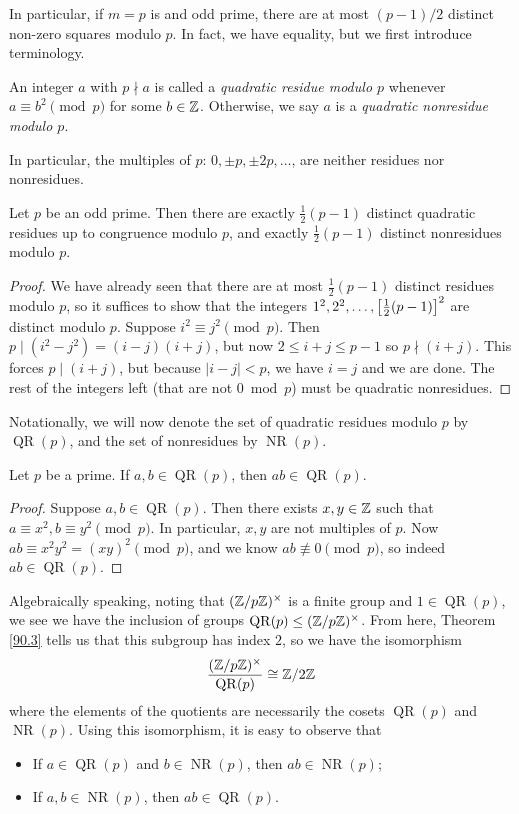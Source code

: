 \documentclass{article}
\DeclareMathOperator{\QR}{\mathrm{QR}}
\DeclareMathOperator{\NR}{\mathrm{NR}}
\begin{document}
In particular, if $m=p$ is and odd prime, there are at most $(p-1)/2$ distinct non-zero squares modulo $p$. In fact, we have equality, but we first introduce terminology.
\begin{definition}
An integer $a$ with $p\nmid a$ is called a \textit{quadratic residue modulo $p$} whenever $a \equiv b^2\pmod p$ for some $b\in \mathbb Z$. Otherwise, we say $a$ is a \textit{quadratic nonresidue modulo $p$}.
\end{definition}
In particular, the multiples of $p$: $0, \pm p, \pm 2p, \ldots$, are neither residues nor nonresidues.

\begin{theorem}\label{90.3}
Let $p$ be an odd prime. Then there are exactly $\frac 12(p-1)$ distinct quadratic residues up to congruence modulo $p$, and exactly $\frac 12(p-1)$ distinct nonresidues modulo $p$.
\end{theorem}
\begin{proof}
We have already seen that there are at most $\frac 12(p-1)$ distinct residues modulo $p$, so it suffices to show that the integers $1^2, 2^2, \ldots, \left[\frac 12(p-1)\right]^2$ are distinct modulo $p$. Suppose $i^2 \equiv j^2\pmod p$. Then $p\mid (i^2 - j^2) = (i-j)(i + j)$, but now $2 \leq i + j \leq p-1$ so $p\nmid (i+j)$. This forces $p\mid (i+j)$, but because $|i - j| < p$, we have $i=j$ and we are done. The rest of the integers left (that are not $0\bmod p$) must be quadratic nonresidues.
\end{proof}

Notationally, we will now denote the set of quadratic residues modulo $p$ by $\QR(p)$, and the set of nonresidues by $\NR(p)$.

\begin{proposition}
Let $p$ be a prime. If $a,b\in \QR(p)$, then $ab \in \QR(p)$.
\end{proposition}
\begin{proof}
Suppose $a,b\in \QR(p)$. Then there exists $x,y\in \mathbb Z$ such that $a \equiv x^2, b\equiv y^2\pmod p$. In particular, $x,y$ are not multiples of $p$. Now $ab \equiv x^2y^2 = (xy)^2 \pmod p$, and we know $ab\not\equiv 0\pmod p$, so indeed $ab\in \QR(p)$.
\end{proof}

Algebraically speaking, noting that $(\mathbb Z/p\mathbb Z)^\times$ is a finite group and $1\in \QR(p)$, we see we have the inclusion of groups $\QR(p) \leq (\Z/p\Z)^\times$. From here, Theorem \ref{90.3} tells us that this subgroup has index $2$, so we have the isomorphism
$$\frac{(\Z/p\Z)^\times}{\QR(p)} \cong \Z/2\Z$$
where the elements of the quotients are necessarily the cosets $\QR(p)$ and $\NR(p)$. Using this isomorphism, it is easy to observe that
\begin{itemize}
    \item If $a\in \QR(p)$ and $b\in \NR(p)$, then $ab\in \NR(p)$;
    \item If $a,b\in \NR(p)$, then $ab\in \QR(p)$.
\end{itemize}
\end{document}
